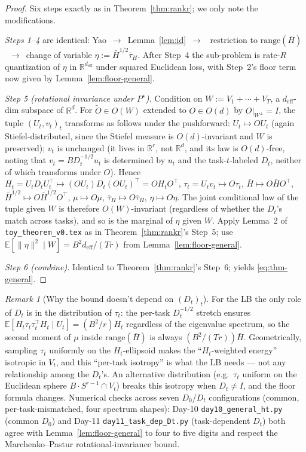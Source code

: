 \documentclass{article}
\theoremstyle{remark}
\newtheorem{remark}[theorem]{Remark}
\newcommand{\R}{\mathbb{R}}
\newcommand{\E}{\mathbb{E}}
\newcommand{\range}{\mathrm{range}}
\newcommand{\deff}{d_{\mathrm{eff}}}
\newcommand{\tauH}{\bar\tau_{H}}
\begin{document}
\begin{proof}
Six steps exactly as in Theorem~\ref{thm:rankr}; we only note the
modifications.

\emph{Steps 1--4} are identical: Yao~$\to$~Lemma~\ref{lem:id}~$\to$~
restriction to $\range(\bar H)$~$\to$~change of variable
$\eta:=\bar H^{1/2}\tauH$. After Step~4 the sub-problem is rate-$R$
quantization of $\eta$ in $\R^{\deff}$ under squared Euclidean loss,
with Step~2's floor term now given by Lemma~\ref{lem:floor-general}.

\emph{Step 5 (rotational invariance under $P^\star$).} Condition on
$W := V_1 + \cdots + V_T$, a $\deff$-dim subspace of $\R^d$. For
$\tilde O\in O(W)$ extended to $O\in O(d)$ by $O|_{W^\perp} = I$, the
tuple $(U_t, v_t)_t$ transforms as follows under the pushforward:
$U_t \mapsto OU_t$ (again Stiefel-distributed, since the Stiefel
measure is $O(d)$-invariant and $W$ is preserved); $v_t$ is unchanged
(it lives in $\R^r$, not $\R^d$, and its law is $O(d)$-free, noting
that $v_t = B D_t^{-1/2} u_t$ is determined by $u_t$ and the
task-$t$-labeled $D_t$, neither of which transforms under $O$).
Hence $H_t = U_t D_t U_t^\top \mapsto (OU_t) D_t (OU_t)^\top =
O H_t O^\top$, $\tau_t = U_t v_t \mapsto O\tau_t$, $\bar H \mapsto
O\bar H O^\top$, $\bar H^{1/2} \mapsto O\bar H^{1/2}O^\top$, $\mu
\mapsto O\mu$, $\tauH \mapsto O\tauH$, $\eta \mapsto O\eta$. The
joint conditional law of the tuple given $W$ is therefore
$O(W)$-invariant (regardless of whether the $D_t$'s match across
tasks), and so is the marginal of $\eta$ given $W$. Apply Lemma~2
of \texttt{toy\_theorem\_v0.tex} as in Theorem~\ref{thm:rankr}'s
Step~5; use $\E[\|\eta\|^2\mid W] = B^2\deff/(Tr)$ from
Lemma~\ref{lem:floor-general}.

\emph{Step 6 (combine).} Identical to Theorem~\ref{thm:rankr}'s
Step~6; yields \eqref{eq:thm-general}.
\end{proof}

\begin{remark}[Why the bound doesn't depend on $(D_t)_t$]
For the LB the only role of $D_t$ is in the distribution of $\tau_t$:
the per-task $D_t^{-1/2}$ stretch ensures $\E[H_t\tau_t\tau_t^\top
H_t \mid U_t] = (B^2/r)H_t$ regardless of the eigenvalue spectrum,
so the second moment of $\mu$ inside $\range(\bar H)$ is always
$(B^2/(Tr))\bar H$. Geometrically, sampling $\tau_t$ uniformly on
the $H_t$-ellipsoid makes the ``$H_t$-weighted energy'' isotropic in
$V_t$, and this ``per-task isotropy'' is what the LB needs --- not
any relationship among the $D_t$'s. An alternative distribution
(e.g.\ $\tau_t$ uniform on the Euclidean sphere $B\cdot S^{r-1}\cap
V_t$) breaks this isotropy when $D_t \neq I$, and the floor formula
changes. Numerical checks across seven $D_0$/$D_t$ configurations
(common, per-task-mismatched, four spectrum shapes): Day-10
\texttt{day10\_general\_ht.py} (common $D_0$) and Day-11
\texttt{day11\_task\_dep\_Dt.py} (task-dependent $D_t$) both agree
with Lemma~\ref{lem:floor-general} to four to five digits and
respect the Marchenko--Pastur rotational-invariance bound.
\end{remark}
\end{document}
